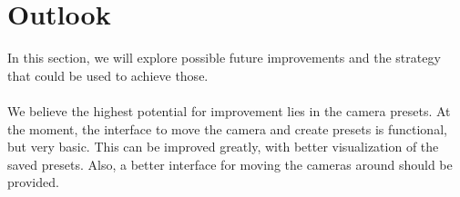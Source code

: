 \section{Outlook}

In this section, we will explore possible future improvements and the strategy that could be used to achieve those.\\\\
We believe the highest potential for improvement lies in the camera presets. At the moment, the interface to move the camera and create presets is functional, but very basic. This can be improved greatly, with better visualization of the saved presets. Also, a better interface for moving the cameras around should be provided.

